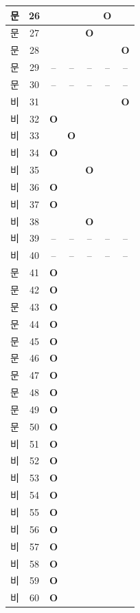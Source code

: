 \documentclass[12pt, a4paper]{article}
\begin{document}
\begin{tabularx}{\textwidth}{|c|c|c|c|c|c|c|}
\hline
[3]문 & 26 &  &  &  & \textbf{O} &  \\
\hline
[3]문 & 27 &  &  & \textbf{O} &  &  \\
\hline
[3]문 & 28 &  &  &  &  & \textbf{O} \\
\hline
[3]문 & 29 & -- & -- & -- & -- & -- \\
\hline
[3]문 & 30 & -- & -- & -- & -- & -- \\
\hline
[4]비 & 31 &  &  &  &  & \textbf{O} \\
\hline
[4]비 & 32 & \textbf{O} &  &  &  &  \\
\hline
[4]비 & 33 &  & \textbf{O} &  &  &  \\
\hline
[4]비 & 34 & \textbf{O} &  &  &  &  \\
\hline
[4]비 & 35 &  &  & \textbf{O} &  &  \\
\hline
[4]비 & 36 & \textbf{O} &  &  &  &  \\
\hline
[4]비 & 37 & \textbf{O} &  &  &  &  \\
\hline
[4]비 & 38 &  &  & \textbf{O} &  &  \\
\hline
[4]비 & 39 & -- & -- & -- & -- & -- \\
\hline
[4]비 & 40 & -- & -- & -- & -- & -- \\
\hline
[5]문 & 41 & \textbf{O} &  &  &  &  \\
\hline
[5]문 & 42 & \textbf{O} &  &  &  &  \\
\hline
[5]문 & 43 & \textbf{O} &  &  &  &  \\
\hline
[5]문 & 44 & \textbf{O} &  &  &  &  \\
\hline
[5]문 & 45 & \textbf{O} &  &  &  &  \\
\hline
[5]문 & 46 & \textbf{O} &  &  &  &  \\
\hline
[5]문 & 47 & \textbf{O} &  &  &  &  \\
\hline
[5]문 & 48 & \textbf{O} &  &  &  &  \\
\hline
[5]문 & 49 & \textbf{O} &  &  &  &  \\
\hline
[5]문 & 50 & \textbf{O} &  &  &  &  \\
\hline
[6]비 & 51 & \textbf{O} &  &  &  &  \\
\hline
[6]비 & 52 & \textbf{O} &  &  &  &  \\
\hline
[6]비 & 53 & \textbf{O} &  &  &  &  \\
\hline
[6]비 & 54 & \textbf{O} &  &  &  &  \\
\hline
[6]비 & 55 & \textbf{O} &  &  &  &  \\
\hline
[6]비 & 56 & \textbf{O} &  &  &  &  \\
\hline
[6]비 & 57 & \textbf{O} &  &  &  &  \\
\hline
[6]비 & 58 & \textbf{O} &  &  &  &  \\
\hline
[6]비 & 59 & \textbf{O} &  &  &  &  \\
\hline
[6]비 & 60 & \textbf{O} &  &  &  &  \\
\hline
\end{tabularx}
\vspace{5mm}
\end{document}
